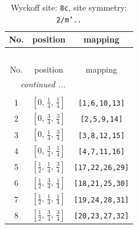 \documentclass[fleqn,8pt]{jsarticle}
\begin{document}
\renewcommand{\arraystretch}{1.2}
\begin{longtable}{ccc}
\caption{Wyckoff site: {\tt 8c}, site symmetry: {\tt 2/m'..}}
 \\
 \hline \hline
No. & position & mapping \\ \hline \endfirsthead

\multicolumn{2}{l}{\tablename\ \thetable{}} \\
 \hline \hline
No. & position & mapping \\ \hline \endhead

 \hline \hline
\multicolumn{2}{r}{\footnotesize\it continued ...} \\ \endfoot

 \hline \hline
\multicolumn{2}{r}{} \\ \endlastfoot

1 & $\left[ 0,\, \frac{1}{4},\, \frac{1}{4} \right]$ & {\tt [1,6,10,13]} \\ \hline
2 & $\left[ 0,\, \frac{3}{4},\, \frac{3}{4} \right]$ & {\tt [2,5,9,14]} \\ \hline
3 & $\left[ 0,\, \frac{1}{4},\, \frac{3}{4} \right]$ & {\tt [3,8,12,15]} \\ \hline
4 & $\left[ 0,\, \frac{3}{4},\, \frac{1}{4} \right]$ & {\tt [4,7,11,16]} \\ \hline
5 & $\left[ \frac{1}{2},\, \frac{1}{4},\, \frac{3}{4} \right]$ & {\tt [17,22,26,29]} \\ \hline
6 & $\left[ \frac{1}{2},\, \frac{3}{4},\, \frac{1}{4} \right]$ & {\tt [18,21,25,30]} \\ \hline
7 & $\left[ \frac{1}{2},\, \frac{1}{4},\, \frac{1}{4} \right]$ & {\tt [19,24,28,31]} \\ \hline
8 & $\left[ \frac{1}{2},\, \frac{3}{4},\, \frac{3}{4} \right]$ & {\tt [20,23,27,32]} \\
\end{longtable}
\renewcommand{\arraystretch}{1.2}
\end{document}
